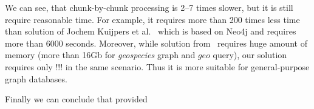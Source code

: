 We can see, that chunk-by-chunk processing is 2--7 times slower, but it is still require reasonable time.
For example, it requires more than 200 times less time than solution of Jochem Kuijpers et al.~\cite{Kuijpers:2019:ESC:3335783.3335791} which is based on Neo4j and requires more than 6000 seconds.
Moreover, while solution from~\cite{10.1145/3398682.3399163} requires huge amount of memory (more than 16Gb for \textit{geospecies} graph and $geo$ query), our solution requires only !!! in the same scenario.
Thus it is more suitable for general-purpose graph databases.

Finally we can conclude that provided 